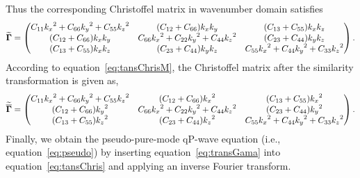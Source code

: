 Thus the corresponding Christoffel matrix in wavenumber domain satisfies
\begin{equation}
\widetilde{\mathbf{\Gamma}}=
 \begin{pmatrix} C_{11}{k_x}^2 + C_{66}{k_y}^2 + C_{55}{k_z}^2  & (C_{12}+C_{66}){k_x}{k_y} &(C_{13}+C_{55}){k_x}{k_z} \cr
         (C_{12}+C_{66}){k_x}{k_y} & C_{66}{k_x}^2+C_{22}{k_y}^2+C_{44}{k_z}^2 &(C_{23}+C_{44}){k_y}{k_z} \cr
         (C_{13}+C_{55}){k_x}{k_z} & (C_{23}+C_{44}){k_y}{k_z} & C_{55}{k_x}^2+C_{44}{k_y}^2+C_{33}{k_z}^2\end{pmatrix}.
\end{equation}
According to equation~\ref{eq:tansChrisM}, the Christoffel matrix after the similarity transformation is given as, 
\begin{equation}
\label{eq:transGama}
\widetilde{\overline{\mathbf{\Gamma}}}=
\begin{pmatrix} C_{11}{k_x}^2+C_{66}{k_y}^2+C_{55}{k_z}^2 &(C_{12}+C_{66}){k_x}^2 &(C_{13}+C_{55}){k_x}^2 \cr
         (C_{12}+C_{66}){k_y}^2 & C_{66}{k_x}^2+C_{22}{k_y}^2+C_{44}{k_z}^2 &(C_{23}+C_{44}){k_y}^2 \cr
         (C_{13}+C_{55}){k_z}^2 & (C_{23}+C_{44}){k_z}^2 & C_{55}{k_x}^2+C_{44}{k_y}^2+C_{33}{k_z}^2\end{pmatrix}.
\end{equation}
Finally, we obtain the pseudo-pure-mode qP-wave equation (i.e., equation~\ref{eq:pseudo})
by inserting equation~\ref{eq:transGama} into equation~\ref{eq:tansChris} and applying an
 inverse Fourier transform.
